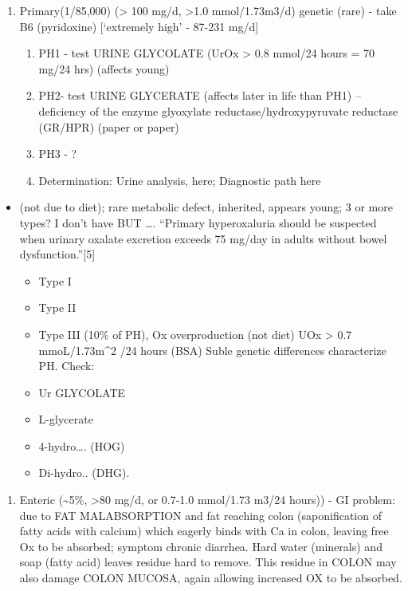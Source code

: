 \begin{enumerate}
\def\labelenumi{\arabic{enumi}.}
\tightlist
\item
  Primary(1/85,000) (\textgreater{} 100 mg/d, \textgreater1.0
  mmol/1.73m3/d) genetic (rare) - take B6 (pyridoxine) {[}`extremely
  high' - 87-231 mg/d{]}

  \begin{enumerate}
  \def\labelenumii{\arabic{enumii}.}
  \item
    PH1 - test URINE GLYCOLATE (UrOx \textgreater{} 0.8 mmol/24 hours =
    70 mg/24 hrs) (affects young)
  \item
    PH2- test URINE GLYCERATE (affects later in life than PH1) --
    deficiency of the enzyme glyoxylate reductase/hydroxypyruvate
    reductase (GR/HPR) (paper or paper)
  \item
    PH3 - ?
  \item
    Determination: Urine analysis, here; Diagnostic path here
  \end{enumerate}
\end{enumerate}

\begin{itemize}
\tightlist
\item
  (not due to diet); rare metabolic defect, inherited, appears young; 3
  or more types? I don't have BUT \ldots. ``Primary hyperoxaluria should
  be suspected when urinary oxalate excretion exceeds 75 mg/day in
  adults without bowel dysfunction.''{[}5{]}

  \begin{itemize}
  \tightlist
  \item
    Type I
  \item
    Type II
  \item
    Type III (10\% of PH), Ox overproduction (not diet) UOx
    \textgreater{} 0.7 mmoL/1.73m\^{}2 /24 hours (BSA) Suble genetic
    differences characterize PH. Check:
  \item
    Ur GLYCOLATE
  \item
    L-glycerate
  \item
    4-hydro\ldots. (HOG)
  \item
    Di-hydro.. (DHG).
  \end{itemize}
\end{itemize}

\begin{enumerate}
\def\labelenumi{\arabic{enumi}.}
\setcounter{enumi}{1}
\tightlist
\item
  Enteric (\textasciitilde5\%, \textgreater80 mg/d, or 0.7-1.0 mmol/1.73
  m3/24 hours)) - GI problem: due to FAT MALABSORPTION and fat reaching
  colon (saponification of fatty acids with calcium) which eagerly binds
  with Ca in colon, leaving free Ox to be absorbed; symptom chronic
  diarrhea. Hard water (minerals) and soap (fatty acid) leaves residue
  hard to remove. This residue in COLON may also damage COLON MUCOSA,
  again allowing increased OX to be absorbed.
\end{enumerate}

